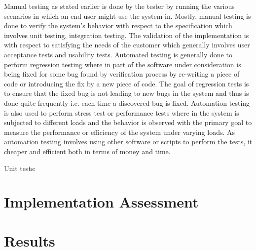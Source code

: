 Manual testing as stated earlier is done by the tester by running the various scenarios in which an end user might use the system in. Mostly, manual testing is done to verify the system's behavior with respect to the specification which involves unit testing, integration testing. The validation of the implementation is with respect to satisfying the needs of the customer which generally involves user acceptance tests and usability tests. Automated testing is generally done to perform regression testing where in part of the software under consideration is being fixed for some bug found by verification process by re-writing a piece of code or introducing the fix by a new piece of code. The goal of regression tests is to ensure that the fixed bug is not leading to new bugs in the system and thus is done quite frequently i.e. each time a discovered bug is fixed. Automation testing is also used to perform stress test or performance tests where in the system is subjected to different loads and the behavior is observed with the primary goal to measure the performance or efficiency of the system under varying loads. As automation testing involves using other software or scripts to perform the tests, it cheaper and efficient both in terms of money and time. \newline 

Unit tests:        

\section{Implementation Assessment}

\section{Results}